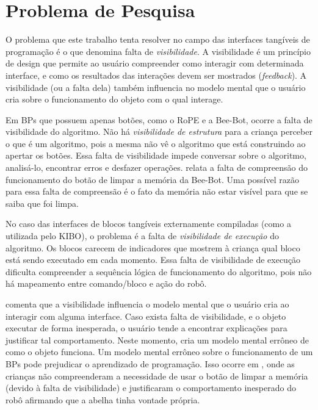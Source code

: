 \section{Problema de Pesquisa} \label{s_cintro_problema_pesquisa}

O problema que este trabalho tenta resolver no campo das interfaces tangíveis de programação é o que  denomina falta de \textit{visibilidade}. A visibilidade é um princípio de design que permite ao usuário compreender como interagir com determinada interface, e como os resultados das interações devem ser mostrados (\textit{feedback}). A visibilidade (ou a falta dela) também influencia no modelo mental que o usuário cria sobre o funcionamento do objeto com o qual interage.

Em BPs que possuem apenas botões, como o RoPE e a Bee-Bot, ocorre a falta de visibilidade do algoritmo. Não há \textit{visibilidade de estrutura} para a criança perceber o que é um algoritmo, pois a mesma não vê o algoritmo que está construindo ao apertar os botões. Essa falta de visibilidade impede conversar sobre o algoritmo, analisá-lo, encontrar erros e desfazer operações.  relata a falta de compreensão do funcionamento do botão de limpar a memória da Bee-Bot. Uma possível razão para essa falta de compreensão é o fato da memória não estar visível para que se saiba que foi limpa.

No caso das interfaces de blocos tangíveis externamente compiladas (como a utilizada pelo KIBO), o problema é a falta de \textit{visibilidade de execução} do algoritmo. Os blocos carecem de indicadores que mostrem à criança qual bloco está sendo executado em cada momento. Essa falta de visibilidade de execução dificulta compreender a sequência lógica de funcionamento do algoritmo, pois não há mapeamento entre comando/bloco e ação do robô.

 comenta que a visibilidade influencia o modelo mental que o usuário cria ao interagir com alguma interface. Caso exista falta de visibilidade, e o objeto executar de forma inesperada, o usuário tende a encontrar explicações para justificar tal comportamento. Neste momento, cria um modelo mental errôneo de como o objeto funciona. Um modelo mental errôneo sobre o funcionamento de um BPs pode prejudicar o aprendizado de programação. Isso ocorre em , onde as crianças não compreenderam a necessidade de usar o botão de limpar a memória (devido à falta de visibilidade) e justificaram o comportamento inesperado do robô afirmando que a abelha tinha vontade própria.

